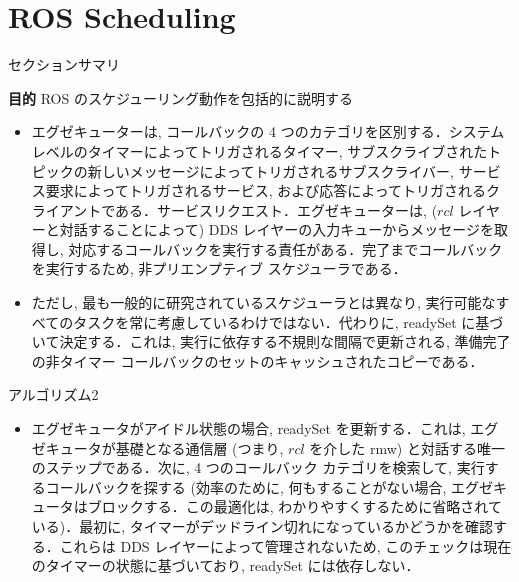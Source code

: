 
\section{ROS Scheduling}
\label{sec: ros scheduling}


\begin{frame}{セクションサマリ}
    \begin{itembox}[l]{\textbf{目的}}
        ROS のスケジューリング動作を包括的に説明する
    \end{itembox}
\end{frame}

\begin{frame}{}
    \begin{itemize}
        \item エグゼキューターは, コールバックの 4 つのカテゴリを区別する．システムレベルのタイマーによってトリガされるタイマー, サブスクライブされたトピックの新しいメッセージによってトリガされるサブスクライバー, サービス要求によってトリガされるサービス, および応答によってトリガされるクライアントである．サービスリクエスト．エグゼキューターは, ($r c l$ レイヤーと対話することによって) DDS レイヤーの入力キューからメッセージを取得し, 対応するコールバックを実行する責任がある．完了までコールバックを実行するため, 非プリエンプティブ スケジューラである．
    \end{itemize}
\end{frame}

\begin{frame}{}
    \begin{itemize}
        \item ただし, 最も一般的に研究されているスケジューラとは異なり, 実行可能なすべてのタスクを常に考慮しているわけではない．代わりに, readySet に基づいて決定する．これは, 実行に依存する不規則な間隔で更新される, 準備完了の非タイマー コールバックのセットのキャッシュされたコピーである．
    \end{itemize}
\end{frame}

\begin{frame}{アルゴリズム2}
\end{frame}

\begin{frame}{}
    \begin{itemize}
        \item エグゼキュータがアイドル状態の場合, readySet を更新する．これは, エグゼキュータが基礎となる通信層 (つまり,  $r c l$ を介した rmw) と対話する唯一のステップである．次に, 4 つのコールバック カテゴリを検索して, 実行するコールバックを探する (効率のために, 何もすることがない場合, エグゼキュータはブロックする．この最適化は, わかりやすくするために省略されている)．最初に, タイマーがデッドライン切れになっているかどうかを確認する．これらは DDS レイヤーによって管理されないため, このチェックは現在のタイマーの状態に基づいており, readySet には依存しない．
    \end{itemize}
\end{frame}

